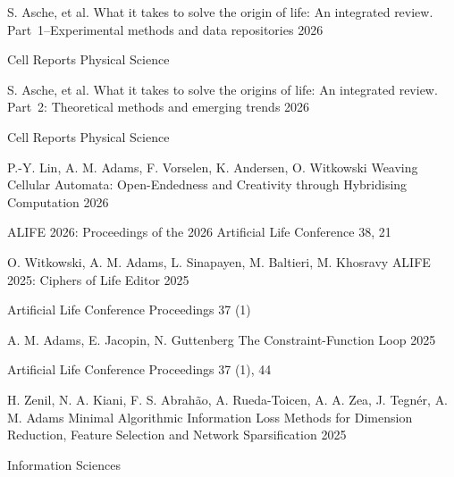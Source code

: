 
\begin{cventries}

\cventry
    {S. Asche, et al.}
    {What it takes to solve the origin of life: An integrated review. Part~1--Experimental methods and data repositories}
    {}
    {2026}
    {
    \begin{cvitems}
        \item {Cell Reports Physical Science}
    \end{cvitems}
    }

\cventry
    {S. Asche, et al.}
    {What it takes to solve the origins of life: An integrated review. Part~2: Theoretical methods and emerging trends}
    {}
    {2026}
    {
    \begin{cvitems}
        \item {Cell Reports Physical Science}
    \end{cvitems}
    }

\cventry
    {P.-Y. Lin, \textcolor{cmyk-magenta}{A. M. Adams}, F. Vorselen, K. Andersen, O. Witkowski}
    {Weaving Cellular Automata: Open-Endedness and Creativity through Hybridising Computation}
    {}
    {2026}
    {
    \begin{cvitems}
        \item {ALIFE 2026: Proceedings of the 2026 Artificial Life Conference 38, 21}
    \end{cvitems}
    }

\cventry
    {O. Witkowski, \textcolor{cmyk-magenta}{A. M. Adams}, L. Sinapayen, M. Baltieri, M. Khosravy}
    {ALIFE 2025: Ciphers of Life}
    {Editor}
    {2025}
    {
    \begin{cvitems}
        \item {Artificial Life Conference Proceedings 37 (1)}
    \end{cvitems}
    }

\cventry
    {\textcolor{cmyk-magenta}{A. M. Adams}, E. Jacopin, N. Guttenberg}
    {The Constraint-Function Loop}
    {}
    {2025}
    {
    \begin{cvitems}
        \item {Artificial Life Conference Proceedings 37 (1), 44}
    \end{cvitems}
    }

\cventry
    {H. Zenil, N. A. Kiani, F. S. Abrah\~{a}o, A. Rueda-Toicen, A. A. Zea, J. Tegn\'er, \textcolor{cmyk-magenta}{A. M. Adams}}
    {Minimal Algorithmic Information Loss Methods for Dimension Reduction, Feature Selection and Network Sparsification}
    {}
    {2025}
    {
    \begin{cvitems}
        \item {Information Sciences}
    \end{cvitems}
    }


\end{cventries}
